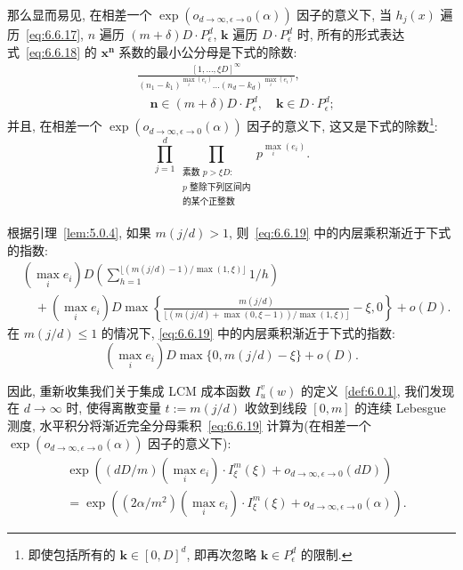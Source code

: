 那么显而易见, 在相差一个 $\exp(o_{d\to\infty,\epsilon\to0}(\alpha))$ 因子的意义下, 当 $h_j(x)$ 遍历~\eqref{eq:6.6.17}, $n$ 遍历 $(m + \delta)D \cdot P^d_{\epsilon}$, $\mathbf{k}$ 遍历 $D \cdot P^d_{\epsilon}$ 时, 所有的形式表达式~\eqref{eq:6.6.18} 的 $\mathbf{x}^{\mathbf{n}}$ 系数的最小公分母是下式的除数:
\[
\begin{aligned}
&\frac{[1,\ldots,\xi D]^{\infty}}{(n_1-k_1)^{\max_i(e_i)}\dots(n_d-k_d)^{\max_i(e_i)}}, \\
&\quad \mathbf{n}\in(m+\delta)D\cdot P^d_{\epsilon}, \quad \mathbf{k}\in D\cdot P^d_{\epsilon};
\end{aligned}
\]
并且, 在相差一个 $\exp(o_{d\to\infty,\epsilon\to0}(\alpha))$ 因子的意义下, 这又是下式的除数\footnote{即使包括所有的 $\mathbf{k} \in [0, D]^d$, 即再次忽略 $\mathbf{k} \in P_{\epsilon}^d$ 的限制.}:
\begin{equation}\label{eq:6.6.19}
\prod_{j=1}^{d} \prod_{\substack{\text{素数 } p > \xi D: \\ p \text{ 整除下列区间内} \\ \text{的某个正整数} \\ [mD(j/d) - D, mD(j/d)]}} p^{\max_{i}(e_{i})}.
\end{equation}

根据引理~\ref{lem:5.0.4}, 如果 $m(j/d) > 1$, 则~\eqref{eq:6.6.19} 中的内层乘积渐近于下式的指数:
\[
\begin{aligned}
&\left(\max_{i} e_{i}\right) D \left( \sum_{h=1}^{\lfloor (m(j/d)-1)/\max(1,\xi)\rfloor} 1/h \right) \\
&\quad + \left(\max_{i} e_{i}\right) D \max \left\{\frac{m(j/d)}{\lfloor (m(j/d)+\max(0,\xi-1))/\max(1,\xi)\rfloor} - \xi, 0\right\} + o(D).
\end{aligned}
\]
在 $m(j/d) \le 1$ 的情况下, \eqref{eq:6.6.19} 中的内层乘积渐近于下式的指数:
\[ \left(\max_{i} e_{i}\right) D \max\{0, m(j/d) - \xi\} + o(D). \]

因此, 重新收集我们关于集成 LCM 成本函数 $I_u^v(w)$ 的定义~\ref{def:6.0.1}, 我们发现在 $d \to \infty$ 时, 使得离散变量 $t := m(j/d)$ 收敛到线段 $[0, m]$ 的连续 Lebesgue 测度, 水平积分将渐近完全分母乘积~\eqref{eq:6.6.19} 计算为(在相差一个 $\exp(o_{d\to\infty,\epsilon\to0}(\alpha))$ 因子的意义下):
\begin{align}
&\exp\left((dD/m)\left(\max_{i} e_{i}\right) \cdot I_{\xi}^{m}(\xi) + o_{d \to \infty, \epsilon \to 0}(dD)\right) \nonumber\\
&= \exp\left((2\alpha/m^{2})\left(\max_{i} e_{i}\right) \cdot I_{\xi}^{m}(\xi) + o_{d \to \infty, \epsilon \to 0}(\alpha)\right).\label{eq:6.6.20}
\end{align}


